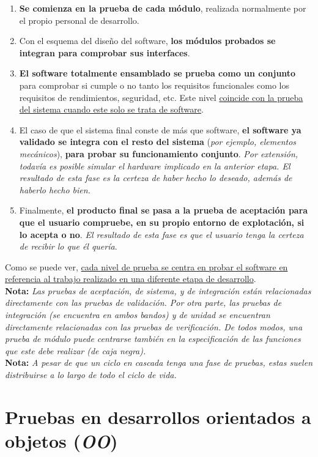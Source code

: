 \begin{enumerate}
    \item \textbf{Se comienza en la prueba de cada módulo}, realizada normalmente por el propio personal de desarrollo.
    \item Con el esquema del diseño del software, \textbf{los módulos probados se integran para comprobar sus interfaces}.
    \item \textbf{El software totalmente ensamblado se prueba como un conjunto} para comprobar si cumple o no tanto los requisitos funcionales como los requisitos de rendimientos, seguridad, etc. Este nivel \uline{coincide con la prueba del sistema cuando este solo se trata de software}.
    \item El caso de que el sistema final conste de más que software, \textbf{el software ya validado se integra con el resto del sistema} (\textit{por ejemplo, elementos mecánicos}), \textbf{para probar su funcionamiento conjunto}. \textit{Por extensión, todavía es posible simular el hardware implicado en la anterior etapa. El resultado de esta fase es la certeza de haber hecho lo deseado, además de haberlo hecho bien.}
    \item Finalmente, \textbf{el producto final se pasa a la prueba de aceptación para que el usuario compruebe, en su propio entorno de explotación, si lo acepta o no}. \textit{El resultado de esta fase es que el usuario tenga la certeza de recibir lo que él quería}.
\end{enumerate}

Como se puede ver, \uline{cada nivel de prueba se centra en probar el software en referencia al trabajo realizado en una diferente etapa de desarrollo}.\\

\textbf{Nota:} \textit{Las pruebas de aceptación, de sistema, y de integración están relacionadas directamente con las pruebas de validación. Por otra parte, las pruebas de integración (se encuentra en ambos bandos) y de unidad se encuentran directamente relacionadas con las pruebas de verificación. De todos modos, una prueba de módulo puede centrarse también en la especificación de las funciones que este debe realizar (de caja negra).}\\

\textbf{Nota:} \textit{A pesar de que un ciclo en cascada tenga una fase de pruebas, estas suelen distribuirse a lo largo de todo el ciclo de vida.}\\


\section{Pruebas en desarrollos orientados a objetos (\textit{OO})}

